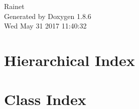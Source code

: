 \documentclass[twoside]{book}
\newcommand{\clearemptydoublepage}{%
  \newpage{\pagestyle{empty}\cleardoublepage}%
}
\begin{document}
\hypersetup{pageanchor=false}
\begin{titlepage}
\vspace*{7cm}
\begin{center}%
{\Large Rainet }\\
\vspace*{1cm}
{\large Generated by Doxygen 1.8.6}\\
\vspace*{0.5cm}
{\small Wed May 31 2017 11:40:32}\\
\end{center}
\end{titlepage}
\clearemptydoublepage
\tableofcontents
\clearemptydoublepage
{}
\hypersetup{pageanchor=true}

\chapter{Hierarchical Index}

\chapter{Class Index}

\end{document}
